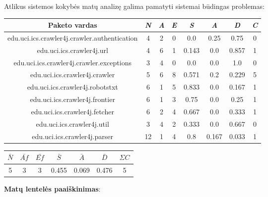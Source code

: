 Atlikus sistemos kokybės matų analizę galima pamatyti sistemai būdingas problemas:
\begin{center}
    \begin{tabular}{|c|c|c|c|c|c|c|c|}
        \hline
        Paketo vardas & \textit{N} & \textit{A} & \textit{E} & \textit{S} & \textit{A} & \textit{D} & \textit{C} \\ [0.5ex]
        \hline\hline
        edu.uci.ics.crawler4j.crawler.authentication & 4 & 2 & 0 & 0.0 & 0.25 & 0.75 & 0\\
        \hline
        edu.uci.ics.crawler4j.url & 4 & 6 & 1 & 0.143 & 0.0 & 0.857 & 1 \\
        \hline
        edu.uci.ics.crawler4j.crawler.exceptions & 3 & 4 & 0 & 0.0 & 0.0 & 1.0 & 0\\
        \hline
        edu.uci.ics.crawler4j.crawler & 5 & 6 & 8 & 0.571 & 0.2 & 0.229 & 5 \\
        \hline
        edu.uci.ics.crawler4j.robotstxt & 6 & 1 & 5 & 0.833 & 0.0 & 0.167 & 1 \\
        \hline
        edu.uci.ics.crawler4j.frontier & 6 & 1 & 3 & 0.75 & 0.0 & 0.25 & 1 \\
        \hline
        edu.uci.ics.crawler4j.fetcher & 6 & 2 & 4 & 0.667 & 0.0 & 0.333 & 1 \\
        \hline
        edu.uci.ics.crawler4j.util & 3 & 4 & 2 & 0.333 & 0.0 & 0.667 & 0 \\
        \hline
        edu.uci.ics.crawler4j.parser & 12 & 1 & 4 & 0.8 & 0.167 & 0.033 & 1 \\
        \hline
    \end{tabular}
    \begin{tabular}{|c|c|c|c|c|c|c|}
        \hline
        $\bar{N}$ & $\bar{Af}$ & $\bar{Ef}$ & $\bar{S}$ & $\bar{A}$ & $\bar{D}$ & $\Sigma C$  \\ [0.5ex]
        \hline\hline
        5 & 3 & 3 & 0.455 & 0.069 & 0.476 & 5\\
        \hline
    \end{tabular}
\end{center}
\textbf{Matų lentelės paaiškinimas}:
